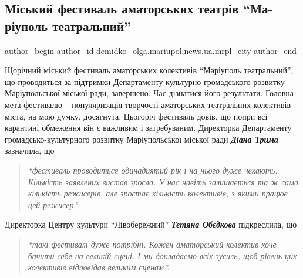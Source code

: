  
 
 
 
 
 
\subsection{Міський фестиваль аматорських театрів \enquote{Ма\hyp{}ріуполь театральний}}
\label{sec:20_12_2021.stz.news.ua.mrpl_city.1.miskyj_fest_amator_teatr_mrpl_teatralnyj}
 
\ifcmt
 author_begin
   author_id demidko_olga.mariupol,news.ua.mrpl_city
 author_end
\fi

Щорічний міський фестиваль аматорських колективів \enquote{Маріуполь театральний}, що
проводиться за підтримки Департаменту культурно-громадського розвитку
Маріупольської міської ради, завершено. Час дізнатися його результати. Головна
мета фестивалю – популяризація творчості аматорських театральних колективів
міста, на мою думку, досягнута. Цьогоріч фестиваль довів, що попри всі
карантині обмеження він є важливим і затребуваним. Директорка Департаменту
громадсько-культурного розвитку Маріупольської міської ради \emph{\textbf{Діана Трима}}
зазначила, що 

\begin{quote}
\em\enquote{фестиваль проводиться одинадцятий рік і на нього дуже чекають.
Кількість заявлених  вистав зросла. У нас навіть залишається та ж сама
кількість режисерів, але зростає кількість колективів, з якими працює цей
режисер}. 
\end{quote}

Директорка Центру культури \enquote{Лівобережний} \emph{\textbf{Тетяна Обєдкова}} підкреслила, що 

\begin{quote}
\em\enquote{такі
фестивалі дуже потрібні. Кожен аматорський колектив хоче бачити себе на великій
сцені. І ми докладаємо всіх зусиль, щоб рівень цих колективів відповідав
великим сценам}.
\end{quote}

